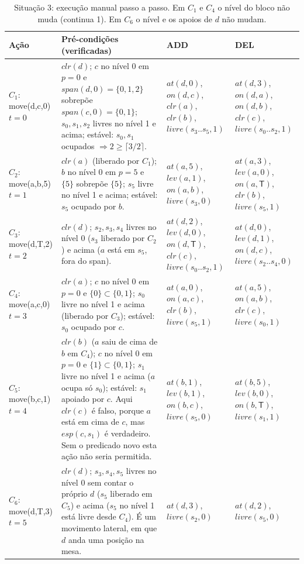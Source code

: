 \documentclass[11pt,a4paper]{article}
\newcommand{\clr}{\mathit{clr}}
\newcommand{\at}{\mathit{at}}
\newcommand{\lev}{\mathit{lev}}
\newcommand{\livre}{\mathit{livre}}
\newcommand{\esp}{\mathit{esp}}
\newcommand{\on}{\mathit{on}}
\newcommand{\spn}{\mathit{span}}
\newcommand{\mesaT}{\mathsf{T}}
\begin{document}
\begin{table}[H]
\centering\small
\renewcommand{\arraystretch}{1.25}
\begin{tabularx}{\textwidth}{@{}p{2.3cm} X X X@{}}
\toprule
Ação & Pré-condições (verificadas) & ADD & DEL\\
\midrule
$C_1$: move(d,c,0)\newline $t=0$ &
$\clr(d)$; $c$ no nível 0 em $p{=}0$ e $\spn(d,0)=\{0,1,2\}$ sobrepõe
$\spn(c,0)=\{0,1\}$; $s_0,s_1,s_2$ livres no nível 1 e acima;
estável: $s_0,s_1$ ocupados $\Rightarrow 2\ge\lceil 3/2\rceil$. &
$\at(d,0)$, $\on(d,c)$, $\clr(a)$, $\clr(b)$, $\livre(s_3..s_5,1)$ &
$\at(d,3)$, $\on(d,a)$, $\on(d,b)$, $\clr(c)$, $\livre(s_0..s_2,1)$\\
\midrule
$C_2$: move(a,b,5)\newline $t=1$ &
$\clr(a)$ (liberado por $C_1$); $b$ no nível 0 em $p{=}5$ e $\{5\}$ sobrepõe $\{5\}$;
$s_5$ livre no nível 1 e acima; estável: $s_5$ ocupado por $b$. &
$\at(a,5)$, $\lev(a,1)$, $\on(a,b)$, $\livre(s_3,0)$ &
$\at(a,3)$, $\lev(a,0)$, $\on(a,\mesaT)$, $\clr(b)$, $\livre(s_5,1)$\\
\midrule
$C_3$: move(d,T,2)\newline $t=2$ &
$\clr(d)$; $s_2,s_3,s_4$ livres no nível 0 ($s_3$ liberado por $C_2$) e acima
($a$ está em $s_5$, fora do span). &
$\at(d,2)$, $\lev(d,0)$, $\on(d,\mesaT)$, $\clr(c)$, $\livre(s_0..s_2,1)$ &
$\at(d,0)$, $\lev(d,1)$, $\on(d,c)$, $\livre(s_2..s_4,0)$\\
\midrule
$C_4$: move(a,c,0)\newline $t=3$ &
$\clr(a)$; $c$ no nível 0 em $p{=}0$ e $\{0\}\subset\{0,1\}$; $s_0$ livre no nível 1
e acima (liberado por $C_3$); estável: $s_0$ ocupado por $c$. &
$\at(a,0)$, $\on(a,c)$, $\clr(b)$, $\livre(s_5,1)$ &
$\at(a,5)$, $\on(a,b)$, $\clr(c)$, $\livre(s_0,1)$\\
\midrule
$C_5$: move(b,c,1)\newline $t=4$ &
$\clr(b)$ ($a$ saiu de cima de $b$ em $C_4$); $c$ no nível 0 em $p{=}0$ e $\{1\}\subset\{0,1\}$;
$s_1$ livre no nível 1 e acima ($a$ ocupa só $s_0$); estável: $s_1$ apoiado por $c$.
Aqui $\clr(c)$ é falso, porque $a$ está em cima de $c$, mas $\esp(c,s_1)$ é
verdadeiro. Sem o predicado novo esta ação não seria permitida. &
$\at(b,1)$, $\lev(b,1)$, $\on(b,c)$, $\livre(s_5,0)$ &
$\at(b,5)$, $\lev(b,0)$, $\on(b,\mesaT)$, $\livre(s_1,1)$\\
\midrule
$C_6$: move(d,T,3)\newline $t=5$ &
$\clr(d)$; $s_3,s_4,s_5$ livres no nível 0 sem contar o próprio $d$ ($s_5$ liberado em
$C_5$) e acima ($s_5$ no nível 1 está livre desde $C_4$). É um movimento lateral, em que $d$ anda uma posição na mesa. &
$\at(d,3)$, $\livre(s_2,0)$ &
$\at(d,2)$, $\livre(s_5,0)$\\
\bottomrule
\end{tabularx}
\caption{Situação 3: execução manual passo a passo. Em $C_1$ e $C_4$ o nível do
bloco não muda (continua 1). Em $C_6$ o nível e os apoios de $d$ não mudam.}
\label{tab:passos3}
\end{table}
\end{document}
